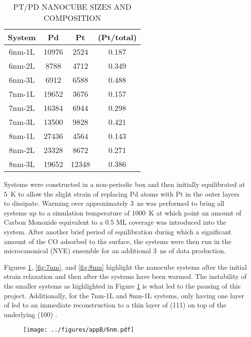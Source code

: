 \begin{table}
  \caption{PT/PD NANOCUBE SIZES AND COMPOSITION}
  \centering
  \begin{threeparttable}
  \begin{tabular}{ c ccc }
  \hline
  \hline
  \textbf{System} & \textbf{Pd} & \textbf{Pt} &  \textbf{(Pt/total)} \\
  \hline
  6nm-1L & 10976 & 2524  & 0.187 \\
  6nm-2L & 8788  & 4712  & 0.349 \\
  6nm-3L & 6912  & 6588  & 0.488 \\
  7nm-1L & 19652 & 3676  & 0.157 \\
  7nm-2L & 16384 & 6944  & 0.298 \\
  7nm-3L & 13500 & 9828  & 0.421 \\
  8nm-1L & 27436 & 4564  & 0.143 \\
  8nm-2L & 23328 & 8672  & 0.271 \\
  8nm-3L & 19652 & 12348 & 0.386 \\
  \hline
  \hline
  \end{tabular}
  \end{threeparttable}
\label{tab:systems}
\end{table}

Systems were constructed in a non-periodic box and then initially equilibrated
at 5~K to allow the slight strain of replacing Pd atoms with Pt in the outer
layers to dissipate. Warming over approximately 3~ns was performed to bring all systems up to
a simulation temperature of 1000~K at which point an amount of Carbon
Monoxide equivalent to a 0.5 ML coverage was introduced into the system.
After another brief period of equilibration during which a
significant amount of the CO adsorbed to the surface, the systems were then run
in the microcanonical (NVE) ensemble for an additional 3~ns of data production.

Figures \ref{fig:6nm}, \ref{fig:7nm}, and \ref{fig:8nm} highlight the nanocube
systems after the initial strain relaxation and then after the systems have
been warmed. The instability of the smaller systems as highlighted in Figure
\ref{fig:6nm} is what led to the pausing of this project. Additionally, for the
7nm-1L and 8nm-1L systems, only having one layer of  led to an immediate
reconstruction to a thin layer of (111)  on top of the underlying (100)
.



\begin{landscape}
\begin{figure}[p!]
  \texttt{[image: ../figures/appB/6nm.pdf]}
  \caption{}
  \label{fig:6nm}
\end{figure}
\end{landscape}


